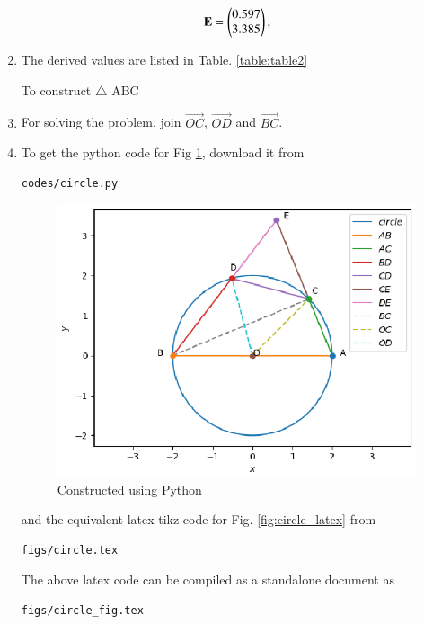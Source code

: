 \begin{enumerate}[label=\thesection.\arabic*.,ref=\thesection.\theenumi]
\begin{align}
\mathbf{E}= \begin{pmatrix}0.597\\3.385\end{pmatrix},
\label{eq:constr_e}
\end{align}
\item The derived values are listed in 
Table. \ref{table:table2} 
\begin{table}[ht!]
\centering

\caption{To construct $\triangle $ ABC}
\label{table:table2}
\end{table}
%
\item For solving the problem, join $\vec{OC}$, $\vec{OD}$ and $\vec{BC}$.
\item To get the python code for Fig \ref{fig:circle_python}, download it from
\begin{lstlisting}
codes/circle.py
\end{lstlisting}
\begin{figure}[!ht]
\centering
\includegraphics[width= \columnwidth]{Figure_1.eps}
\caption{Constructed using Python}
\label{fig:circle_python}
\end{figure}
%
and the equivalent latex-tikz code for Fig. \ref{fig:circle_latex} from
\begin{lstlisting}
figs/circle.tex
\end{lstlisting}
%
The above latex code can be compiled as a standalone document as
\begin{lstlisting}
figs/circle_fig.tex
\end{lstlisting}



\end{enumerate}